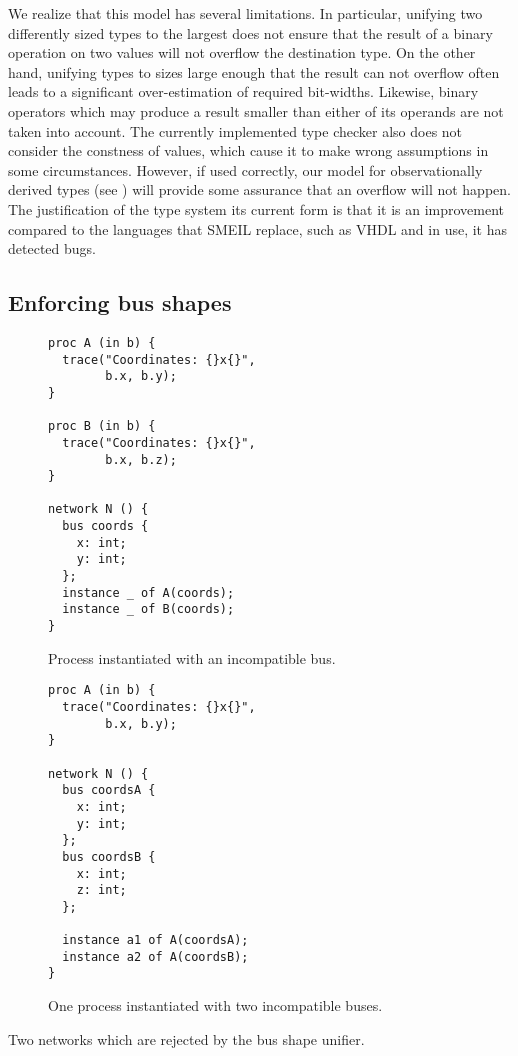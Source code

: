 We realize that this model has several limitations. In particular, unifying two
differently sized types to the largest does not ensure that the result of a
binary operation on two values will not overflow the destination type. On the
other hand, unifying types to sizes large enough that the result can not
overflow often leads to a significant over-estimation of required
bit-widths. Likewise, binary operators which may produce a result smaller than
either of its operands are not taken into account. The currently implemented
type checker also does not consider the constness of values, which cause it to
make wrong assumptions in some circumstances.
However, if used correctly, our model for observationally derived types (see
) will provide some assurance that an overflow will not
happen. The justification of the type system its current form is that it is an
improvement compared to the languages that SMEIL replace, such as VHDL and in
use, it has detected bugs.

\subsection{Enforcing bus shapes}
\begin{widefigure}
  \begin{subfigure}[t]{0.49\textwidth}
\begin{lstlisting}[language=smeil]
proc A (in b) {
  trace("Coordinates: {}x{}",
        b.x, b.y);
}

proc B (in b) {
  trace("Coordinates: {}x{}",
        b.x, b.z);
}

network N () {
  bus coords {
    x: int;
    y: int;
  };
  instance _ of A(coords);
  instance _ of B(coords);
}
\end{lstlisting}
    \caption{Process instantiated with an incompatible bus.}
    \label{fig:incom1}
   
  \end{subfigure}
\begin{subfigure}[t]{0.49\textwidth}  
\begin{lstlisting}[language=smeil]
proc A (in b) {
  trace("Coordinates: {}x{}",
        b.x, b.y);
}

network N () {
  bus coordsA {
    x: int;
    y: int;
  };
  bus coordsB {
    x: int;
    z: int;
  };

  instance a1 of A(coordsA);
  instance a2 of A(coordsB);
}
\end{lstlisting}
    \caption{One process instantiated with two incompatible buses.}
    \label{fig:incom2}
  \end{subfigure}
  \caption{Two networks which are rejected by the bus shape unifier.}
  \label{fig:busuni}
\end{widefigure}


